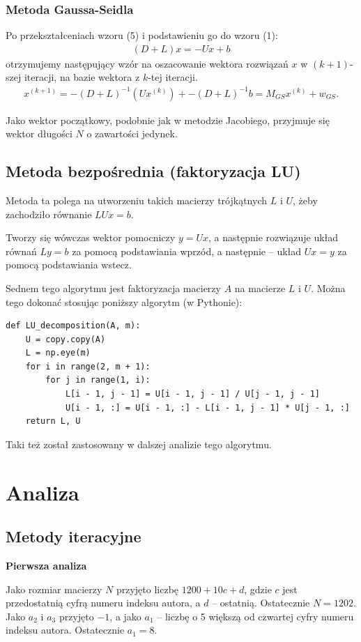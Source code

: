\documentclass{article}
\begin{document}
\subsubsection{Metoda Gaussa-Seidla}
Po przekształceniach wzoru (5) i podstawieniu go do wzoru (1):
\begin{align}
    (D+L)x=-Ux+b
\end{align}
otrzymujemy następujący wzór na oszacowanie wektora rozwiązań $x$ w $(k+1)$-szej iteracji, na bazie wektora z $k$-tej iteracji.
\begin{align}
    x^{(k+1)} = -(D+L)^{-1}(Ux^{(k)}) + -(D+L)^{-1}b = M_{GS}x^{(k)} + w_{GS}.
\end{align}

Jako wektor początkowy, podobnie jak w metodzie Jacobiego, przyjmuje się wektor długości $N$ o zawartości jedynek.

\subsection{Metoda bezpośrednia (faktoryzacja LU)}
Metoda ta polega na utworzeniu takich macierzy trójkątnych $L$ i $U$, żeby zachodziło równanie $LUx = b$. 

Tworzy się wówczas wektor pomocniczy $y = Ux$, a następnie rozwiązuje układ równań $Ly = b$ za pomocą podstawiania wprzód, a następnie -- układ $Ux = y$ za pomocą podstawiania wstecz.

Sednem tego algorytmu jest faktoryzacja macierzy $A$ na macierze $L$ i $U$. Można tego dokonać stosując poniższy algorytm (w Pythonie):
\begin{verbatim}
def LU_decomposition(A, m):
    U = copy.copy(A)
    L = np.eye(m)
    for i in range(2, m + 1):
        for j in range(1, i):
            L[i - 1, j - 1] = U[i - 1, j - 1] / U[j - 1, j - 1]
            U[i - 1, :] = U[i - 1, :] - L[i - 1, j - 1] * U[j - 1, :]
    return L, U
\end{verbatim}
Taki też został zastosowany w dalszej analizie tego algorytmu.

\section{Analiza}
\subsection{Metody iteracyjne}

\textbf{Pierwsza analiza}

Jako rozmiar macierzy $N$ przyjęto liczbę $1200 + 10c + d$, gdzie $c$ jest przedostatnią cyfrą numeru indeksu autora, a $d$ -- ostatnią. Ostatecznie $N = 1202$. Jako $a_2$ i $a_3$ przyjęto $-1$, a jako $a_1$ -- liczbę o 5 większą od czwartej cyfry numeru indeksu autora. Ostatecznie $a_1 = 8$.
\end{document}
